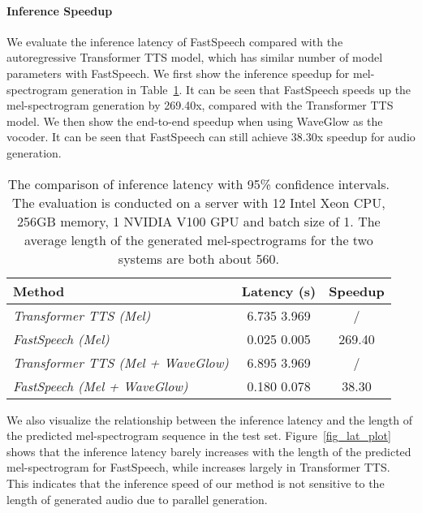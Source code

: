 \documentclass{article}
\begin{document}
\paragraph{Inference Speedup}
\label{exp_infer_speed}
We evaluate the inference latency of FastSpeech compared with the autoregressive Transformer TTS model, which has similar number of model parameters with FastSpeech. We first show the inference speedup for mel-spectrogram generation in Table~\ref{tab_rate_results}. It can be seen that FastSpeech speeds up the mel-spectrogram generation by 269.40x, compared with the Transformer TTS model. We then show the end-to-end speedup when using WaveGlow as the vocoder. It can be seen that FastSpeech can still achieve 38.30x speedup for audio generation.



\begin{table}[h]
	\centering
	\begin{tabular}{ l | c | c }
		\toprule
		Method & Latency (s) & Speedup  \\
		\midrule
		\textit{Transformer TTS \citep{li2018close} (Mel)} & 6.735  3.969 & / \\
		\textit{FastSpeech (Mel)} & 0.025  0.005 & 269.40  \\
		\midrule 
		\textit{Transformer TTS \citep{li2018close} (Mel + WaveGlow)} & 6.895  3.969 & / \\
		\textit{FastSpeech (Mel + WaveGlow)} & 0.180  0.078 & 38.30 \\
		\bottomrule
	\end{tabular}
	\vspace{0.3cm}
	\caption{The comparison of inference latency with 95\% confidence intervals. The evaluation is conducted on a server with 12 Intel Xeon CPU, 256GB memory, 1 NVIDIA V100 GPU and batch size of 1. The average length of the generated mel-spectrograms for the two systems are both about 560.}
	\label{tab_rate_results}
\end{table}





We also visualize the relationship between the inference latency and the length of the predicted mel-spectrogram sequence in the test set. Figure~\ref{fig_lat_plot} shows that the inference latency barely increases with the length of the predicted mel-spectrogram for FastSpeech, while increases largely in Transformer TTS. This indicates that the inference speed of our method is not sensitive to the length of generated audio due to parallel generation.
\end{document}

